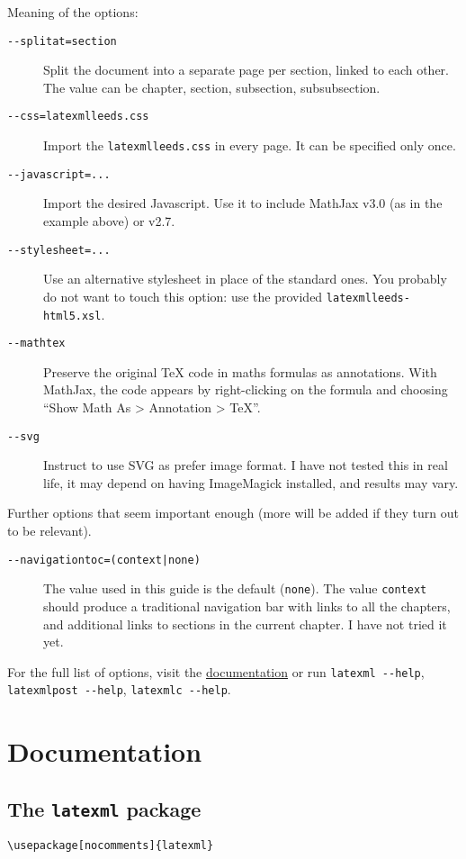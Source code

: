 \documentclass[a4paper]{article}
\theoremstyle{definition}
\begin{document}
Meaning of the options:
\begin{description}
  \item[\texttt{{-}{-}splitat=section}] Split the document into a separate \HTML{} page per section, linked to each other. The value can be chapter, section, subsection, subsubsection.
  \item[\texttt{{-}{-}css=latexmlleeds.css}] Import the \CSS{} \verb|latexmlleeds.css| in every page. It can be specified only once.
  \item[\texttt{{-}{-}javascript=...}] Import the desired Javascript. Use it to include MathJax v3.0 (as in the example above) or v2.7.
  \item[\texttt{{-}{-}stylesheet=...}] Use an alternative \XSLT{} stylesheet in place of the standard ones. You probably do not want to touch this option: use the provided \verb|latexmlleeds-html5.xsl|.
  \item[\texttt{{-}{-}mathtex}] Preserve the original \TeX{} code in maths formulas as annotations. With MathJax, the code appears by right-clicking on the formula and choosing ``Show Math As > Annotation > TeX''.
  \item[\texttt{{-}{-}svg}] Instruct \LaTeXML{} to use SVG as prefer image format. I have not tested this in real life, it may depend on having ImageMagick installed, and results may vary.
\end{description}
Further options that seem important enough (more will be added if they turn out to be relevant).
\begin{description}
  \item[\texttt{{-}{-}navigationtoc=(context|none)}] The value used in this guide is the default (\verb|none|). The value \verb|context| should produce a traditional navigation bar with links to all the chapters, and additional links to sections in the current chapter. I have not tried it yet.
\end{description}
For the full list of options, visit the \href{https://dlmf.nist.gov/LaTeXML/docs.html}{\LaTeXML{} documentation} or run \verb|latexml --help|, \verb|latexmlpost --help|, \verb|latexmlc --help|.


\section{Documentation}

\subsection{The \texttt{latexml} package}
\begin{lstlisting}[style=latexml,caption={Import \texttt{latexml} in the preamble}]
  \usepackage[nocomments]{latexml}
\end{lstlisting}
\end{document}
